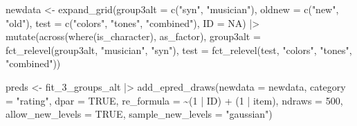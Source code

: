 \documentclass[
  man,floatsintext]{apa7}
\newenvironment{Shaded}{\begin{snugshade}}{\end{snugshade}}
\newcommand{\AttributeTok}[1]{\textcolor[rgb]{0.77,0.63,0.00}{#1}}
\newcommand{\ConstantTok}[1]{\textcolor[rgb]{0.00,0.00,0.00}{#1}}
\newcommand{\DecValTok}[1]{\textcolor[rgb]{0.00,0.00,0.81}{#1}}
\newcommand{\FunctionTok}[1]{\textcolor[rgb]{0.00,0.00,0.00}{#1}}
\newcommand{\NormalTok}[1]{#1}
\newcommand{\OtherTok}[1]{\textcolor[rgb]{0.56,0.35,0.01}{#1}}
\newcommand{\SpecialCharTok}[1]{\textcolor[rgb]{0.00,0.00,0.00}{#1}}
\newcommand{\StringTok}[1]{\textcolor[rgb]{0.31,0.60,0.02}{#1}}
\begin{document}
\begin{Shaded}
\begin{Highlighting}[]
\NormalTok{newdata }\OtherTok{\textless{}{-}} \FunctionTok{expand\_grid}\NormalTok{(}\AttributeTok{group3alt =} \FunctionTok{c}\NormalTok{(}\StringTok{"syn"}\NormalTok{, }\StringTok{"musician"}\NormalTok{),}
                       \AttributeTok{oldnew =} \FunctionTok{c}\NormalTok{(}\StringTok{"new"}\NormalTok{, }\StringTok{"old"}\NormalTok{),}
                       \AttributeTok{test =} \FunctionTok{c}\NormalTok{(}\StringTok{"colors"}\NormalTok{, }\StringTok{"tones"}\NormalTok{, }\StringTok{"combined"}\NormalTok{), }
                       \AttributeTok{ID =} \ConstantTok{NA}\NormalTok{) }\SpecialCharTok{|\textgreater{}} 
  \FunctionTok{mutate}\NormalTok{(}\FunctionTok{across}\NormalTok{(}\FunctionTok{where}\NormalTok{(is\_character), as\_factor),}
         \AttributeTok{group3alt =} \FunctionTok{fct\_relevel}\NormalTok{(group3alt,}
                                 \StringTok{"musician"}\NormalTok{, }\StringTok{"syn"}\NormalTok{),}
         \AttributeTok{test =} \FunctionTok{fct\_relevel}\NormalTok{(test,}
                            \StringTok{"colors"}\NormalTok{, }\StringTok{"tones"}\NormalTok{, }\StringTok{"combined"}\NormalTok{))}

\NormalTok{preds }\OtherTok{\textless{}{-}}\NormalTok{ fit\_3\_groups\_alt }\SpecialCharTok{|\textgreater{}} 
  \FunctionTok{add\_epred\_draws}\NormalTok{(}\AttributeTok{newdata =}\NormalTok{ newdata,}
                  \AttributeTok{category =} \StringTok{"rating"}\NormalTok{,}
                  \AttributeTok{dpar =} \ConstantTok{TRUE}\NormalTok{,}
                  \AttributeTok{re\_formula =} \SpecialCharTok{\textasciitilde{}}\NormalTok{(}\DecValTok{1} \SpecialCharTok{|}\NormalTok{ ID) }\SpecialCharTok{+}\NormalTok{ (}\DecValTok{1} \SpecialCharTok{|}\NormalTok{ item),}
                  \AttributeTok{ndraws =} \DecValTok{500}\NormalTok{,}
                  \AttributeTok{allow\_new\_levels =} \ConstantTok{TRUE}\NormalTok{,}
                  \AttributeTok{sample\_new\_levels =} \StringTok{"gaussian"}\NormalTok{)}
\end{Highlighting}
\end{Shaded}
\end{document}
